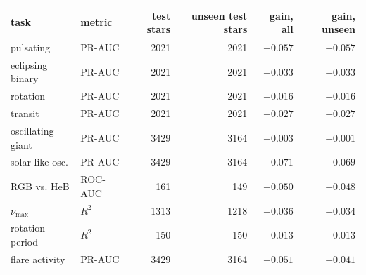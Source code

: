 \begin{tabular}{llrrrr}
\toprule
task & metric & test stars & unseen test stars & gain, all & gain, unseen \\
\midrule
pulsating & PR-AUC & 2021 & 2021 & $\boldsymbol{+}\mathbf{0.057}$ & $\boldsymbol{+}\mathbf{0.057}$ \\
eclipsing binary & PR-AUC & 2021 & 2021 & $\boldsymbol{+}\mathbf{0.033}$ & $\boldsymbol{+}\mathbf{0.033}$ \\
rotation & PR-AUC & 2021 & 2021 & ${+}0.016$ & ${+}0.016$ \\
transit & PR-AUC & 2021 & 2021 & $\boldsymbol{+}\mathbf{0.027}$ & $\boldsymbol{+}\mathbf{0.027}$ \\
oscillating giant & PR-AUC & 3429 & 3164 & $\boldsymbol{-}\mathbf{0.003}$ & ${-}0.001$ \\
solar-like osc. & PR-AUC & 3429 & 3164 & $\boldsymbol{+}\mathbf{0.071}$ & $\boldsymbol{+}\mathbf{0.069}$ \\
RGB vs. HeB & ROC-AUC & 161 & 149 & $\boldsymbol{-}\mathbf{0.050}$ & $\boldsymbol{-}\mathbf{0.048}$ \\
$\nu_{\max}$ & $R^2$ & 1313 & 1218 & $\boldsymbol{+}\mathbf{0.036}$ & $\boldsymbol{+}\mathbf{0.034}$ \\
rotation period & $R^2$ & 150 & 150 & $\boldsymbol{+}\mathbf{0.013}$ & $\boldsymbol{+}\mathbf{0.013}$ \\
flare activity & PR-AUC & 3429 & 3164 & $\boldsymbol{+}\mathbf{0.051}$ & $\boldsymbol{+}\mathbf{0.041}$ \\
\bottomrule
\end{tabular}
